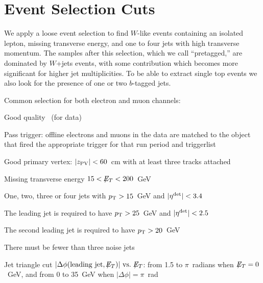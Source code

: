 %

\section{Event Selection Cuts}
\label{selection-cuts}

We apply a loose event selection to find $W$-like events containing an
isolated lepton, missing transverse energy, and one to four jets with
high transverse momentum. The samples after this selection, which we
call ``pretagged,'' are dominated by $W$+jets events, with some
{\ttbar} contribution which becomes more significant for higher jet
multiplicities. To be able to extract single top events we also look
for the presence of one or two $b$-tagged jets.

Common selection for both electron and muon channels:
\vspace{-0.08in}
\begin{myitemize}
\item Good quality~\cite{dataquality} (for data)
\item Pass trigger: offline electrons and muons in the data are
matched to the object that fired the appropriate trigger for that
run period and triggerlist
\item Good primary vertex: $|z_{\rm PV}| < 60$~cm with at least three
tracks attached
\item Missing transverse energy $15 < {\mbox{$\not\!\!E_T$}} < 200$~GeV
\item One, two, three or four jets with ${\mbox{$p_{\rm T}$}} > 15$~GeV and
$|\mbox{$\eta^{\rm det}$}|<3.4$ 
\item The leading jet is required to have ${\mbox{$p_{\rm T}$}} > 25$~GeV and
$|\mbox{$\eta^{\rm det}$}| < 2.5$
\item The second leading jet is required to have ${\mbox{$p_{\rm T}$}} > 20$~GeV
\item There must be fewer than three noise jets
\item Jet triangle cut $|\Delta\phi({\rm leading~jet,{\mbox{$\not\!\!E_T$}}})|
{\rm ~vs.~}{\mbox{$\not\!\!E_T$}}$: from 1.5 to $\pi$~radians when ${\mbox{$\not\!\!E_T$}} = 0$~GeV,
and {\met} from 0 to 35~GeV when $|\Delta\phi| = \pi$~rad
\end{myitemize}

